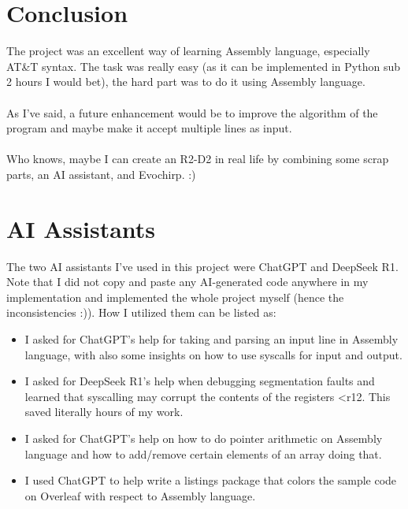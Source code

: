 \documentclass[a4paper,12pt]{article}
\begin{document}
\section{Conclusion}
The project was an excellent way of learning Assembly language, especially AT\&T syntax. The task was really easy (as it can be implemented in Python sub 2 hours I would bet), the hard part was to do it using Assembly language.\\\\ As I've said, a future enhancement would be to improve the algorithm of the program and maybe make it accept multiple lines as input.\\\\ Who knows, maybe I can create an R2-D2 in real life by combining some scrap parts, an AI assistant, and Evochirp. :)

\section*{AI Assistants}
The two AI assistants I've used in this project were ChatGPT and DeepSeek R1. Note that I did not copy and paste any AI-generated code anywhere in my implementation and implemented the whole project myself (hence the inconsistencies :)). How I utilized them can be listed as:\begin{itemize}
    \item I asked for ChatGPT's help for taking and parsing an input line in Assembly language, with also some insights on how to use syscalls for input and output.
    \item I asked for DeepSeek R1's help when debugging segmentation faults and learned that syscalling may corrupt the contents of the registers <r12. This saved literally hours of my work.
    \item I asked for ChatGPT's help on how to do pointer arithmetic on Assembly language and how to add/remove certain elements of an array doing that.
    \item I used ChatGPT to help write a listings package that colors the sample code on Overleaf with respect to Assembly language.
\end{itemize}
\end{document}
